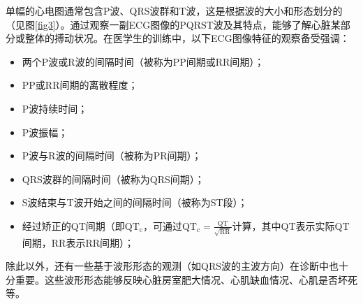 单幅的心电图通常包含P波、QRS波群和T波，这是根据波的大小和形态划分的（见图\ref{fig3}）。通过观察一副ECG图像的PQRST波及其特点，能够了解心脏某部分或整体的搏动状况。在医学生的训练中，以下ECG图像特征的观察备受强调：
\begin{itemize}
\item 两个P波或R波的间隔时间（被称为PP间期或RR间期）；
\item PP或RR间期的离散程度；
\item P波持续时间；
\item P波振幅；
\item P波与R波的间隔时间（被称为PR间期）；
\item QRS波群的间隔时间（被称为QRS间期）；
\item S波结束与T波开始之间的间隔时间（被称为ST段）；
\item 经过矫正的QT间期（即$\mathrm{QT_c}$，可通过$\mathrm{QT_c = \frac{QT}{\sqrt{RR}}}$计算，其中QT表示实际QT间期，RR表示RR间期）；
\end{itemize}

除此以外，还有一些基于波形形态的观测（如QRS波的主波方向）在诊断中也十分重要。这些波形形态能够反映心脏房室肥大情况、心肌缺血情况、心肌是否坏死等。
